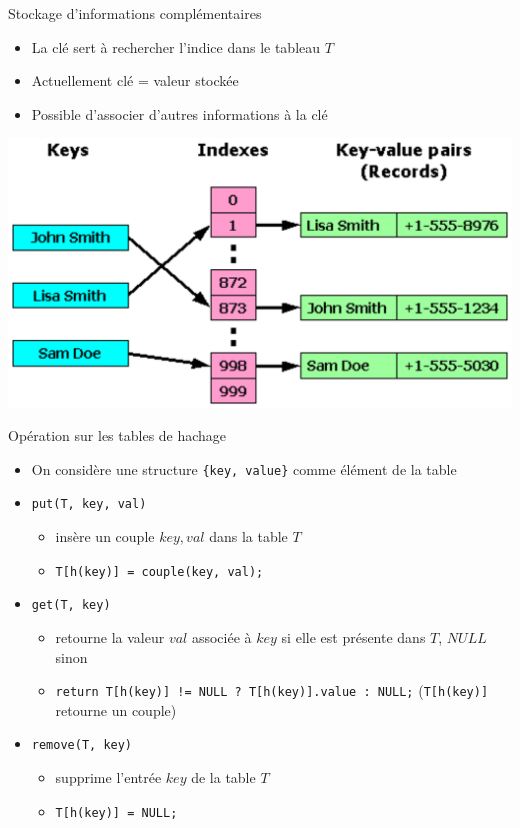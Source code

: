 \documentclass{beamer}
\begin{document}
  \begin{frame}{Stockage d'informations complémentaires}
    \begin{itemize}
      \item{La clé sert à rechercher l'indice dans le tableau $T$}
      \item{Actuellement clé = valeur stockée}
      \item{Possible d'associer d'autres informations à la clé}
    \end{itemize}
    \centering
    \includegraphics[scale=0.7]{./imgs/keyval.eps}
  \end{frame}

  \begin{frame}{Opération sur les tables de hachage}
    \begin{itemize}
      \item{On considère une structure \texttt{\{key, value\}} comme élément de la table}
      \item{\texttt{put(T, key, val)}}
      \begin{itemize}
        \item{insère un couple $key, val$ dans la table $T$}
        \item{\texttt{T[h(key)] = couple(key, val);}}
      \end{itemize}
      \item{\texttt{get(T, key)}}
      \begin{itemize}
        \item{retourne la valeur $val$ associée à $key$ si elle est présente dans $T$, $NULL$ sinon}
        \item{\texttt{return T[h(key)] != NULL ? T[h(key)].value : NULL;} (\texttt{T[h(key)]} retourne un couple)}
      \end{itemize}
      \item{\texttt{remove(T, key)}}
      \begin{itemize}
        \item{supprime l'entrée $key$ de la table $T$}
        \item{\texttt{T[h(key)] = NULL;}}
      \end{itemize}
    \end{itemize}
  \end{frame}
\end{document}
